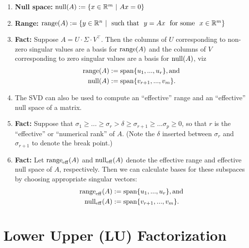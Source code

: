 \begin{tcolorbox}[title=\textbf{Other Interesting and Useful Facts}]
\begin{enumerate}
\setlength{\itemsep}{.2cm}
\renewcommand{\labelenumi}{(\alph{enumi})}

\item \textbf{Null space:} $\mathrm{null}(A):=\{ x\in \mathbb R^m~|~ Ax = 0\}$


\item \textbf{Range:} $\mathrm{range}(A):=\{ y\in \mathbb R^n~|~~\text{such that}~~ y = Ax~~\text{for some}~~x \in \mathbb R^m \}$


 \item \textbf{Fact:} Suppose $A = U \cdot \Sigma \cdot V^\top$. Then the columns of $U$ corresponding to non-zero singular values are a basis for $\mathrm{range}(A)$ and the columns of $V$ corresponding to zero singular values are a basis for $\mathrm{null}(A)$, viz
 \begin{align*}
    \mathrm{range}(A) &:= \mathrm{span} \{ u_1, ..., u_r \}, \text{and}\\
    \mathrm{null}(A) &:= \mathrm{span} \{ v_{r+1}, ..., v_m \}.
\end{align*}

\item The SVD can also be used to compute an ``effective'' range and an ``effective'' null space of a matrix.

\item \textbf{Fact:} Suppose that $\sigma_1 \geq ... \geq \sigma_r > \delta \ge  \sigma_{r+1} \geq ... \sigma_p \geq 0$, so that $r$ is the ``effective'' or ``numerical rank'' of $A$. (Note the $\delta$ inserted between $\sigma_r$ and $\sigma_{r+1}$ to denote the break point.)

\item \textbf{Fact:} Let $\mathrm{range}_{\rm eff}(A)$ and $\mathrm{null}_{\rm eff}(A)$ denote the effective range and effective null space of $A$, respectively. Then we can calculate bases for these subspaces by choosing appropriate singular vectors:
\begin{align*}
    \mathrm{range}_{\rm eff}(A) &:= \mathrm{span} \{ u_1, ..., u_r \}, \text{and}\\
    \mathrm{null}_{\rm eff}(A) &:= \mathrm{span} \{ v_{r+1}, ..., v_m \}.
\end{align*}

\end{enumerate}

\end{tcolorbox}

\section{Lower Upper (LU) Factorization}

